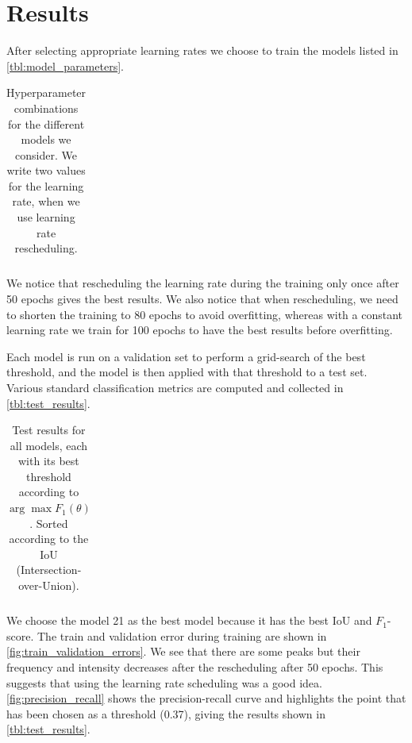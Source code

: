 \documentclass[10pt,conference]{IEEEtran}
\begin{document}
\section{Results}
After selecting appropriate learning rates we choose to train the models listed in \autoref{tbl:model_parameters}.
\begin{table}
    \begin{center}
        \begin{tabular}{||c | c c c c||}
             \hline
             
        \end{tabular}
    \end{center}
    \caption{Hyperparameter combinations for the different models we consider. We write two values for the learning rate, when we use learning rate rescheduling. 
    }
    \label{tbl:model_parameters}
\end{table} 

We notice that rescheduling the learning rate during the training only once after 50 epochs gives the best results.
We also notice that when rescheduling, we need to shorten the training to 80 epochs to avoid overfitting,
whereas with a constant learning rate we train for 100 epochs to have the best results before overfitting.

Each model is run on a validation set to perform a grid-search of the best threshold,
and the model is then applied with that threshold to a test set.
Various standard classification metrics are computed and collected in \autoref{tbl:test_results}.

\begin{table}
    \begin{center}
        \begin{tabular}{||c | c c c c||}
             \hline
             
        \end{tabular}
    \end{center}
    \caption{Test results for all models, each with its best threshold according to $\arg\max F_1(\theta)$. Sorted according to the IoU (Intersection-over-Union).
    }
    \label{tbl:test_results}
\end{table}

We choose the model 21 as the best model because it has the best IoU and $F_1$-score.
The train and validation error during training are shown in \autoref{fig:train_validation_errors}.
We see that there are some peaks but their frequency and intensity decreases after the rescheduling after 50 epochs. This suggests that using the learning rate scheduling was a good idea. \autoref{fig:precision_recall} shows the precision-recall curve and highlights the point that has been chosen as a threshold (0.37), giving the results shown in \autoref{tbl:test_results}.
\end{document}
